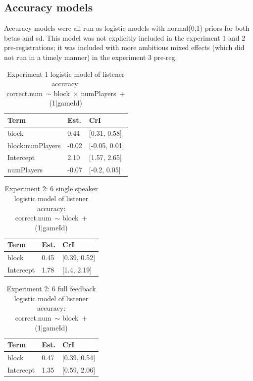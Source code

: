 \documentclass[
  english,
  a4paper,
]{article}
\begin{document}
\hypertarget{accuracy-models}{%
\subsection{Accuracy models}\label{accuracy-models}}

Accuracy models were all run as logistic models with normal(0,1) priors for both betas and sd. This model was not explicitly included in the experiment 1 and 2 pre-registrations; it was included with more ambitious mixed effects (which did not run in a timely manner) in the experiment 3 pre-reg.

\begin{table}[h!]

\caption{\label{tab:unnamed-chunk-10}Experiment 1 logistic model of listener accuracy:\\ correct.num~$\sim$ block~$\times$ numPlayers~+ (1|gameId)}
\centering
\begin{tabular}[t]{lll}
\toprule
Term & Est. & CrI\\
\midrule
block & 0.44 & {}[0.31, 0.58]\\
block:numPlayers & -0.02 & {}[-0.05, 0.01]\\
Intercept & 2.10 & {}[1.57, 2.65]\\
numPlayers & -0.07 & {}[-0.2, 0.05]\\
\bottomrule
\end{tabular}
\end{table}

\begin{table}[h!]

\caption{\label{tab:unnamed-chunk-10}Experiment 2: 6 single speaker logistic model of listener accuracy:\\ correct.num~$\sim$ block~+ (1|gameId)}
\centering
\begin{tabular}[t]{lll}
\toprule
Term & Est. & CrI\\
\midrule
block & 0.45 & {}[0.39, 0.52]\\
Intercept & 1.78 & {}[1.4, 2.19]\\
\bottomrule
\end{tabular}
\end{table}

\begin{table}[h!]

\caption{\label{tab:unnamed-chunk-10}Experiment 2: 6 full feedback logistic model of listener accuracy:\\ correct.num~$\sim$ block~+ (1|gameId)}
\centering
\begin{tabular}[t]{lll}
\toprule
Term & Est. & CrI\\
\midrule
block & 0.47 & {}[0.39, 0.54]\\
Intercept & 1.35 & {}[0.59, 2.06]\\
\bottomrule
\end{tabular}
\end{table}
\end{document}
